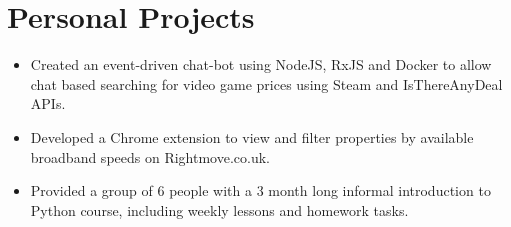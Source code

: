 \section{Personal Projects}

\begin{itemize}
	\setlength\itemsep{0em}
	\item Created an event-driven chat-bot using NodeJS, RxJS and Docker to allow chat based searching for video game prices using Steam and IsThereAnyDeal APIs.
	\item Developed a Chrome extension to view and filter properties by available broadband speeds on Rightmove.co.uk.
	\item Provided a group of 6 people with a 3 month long informal introduction to Python course, including weekly lessons and homework tasks. 
\end{itemize}